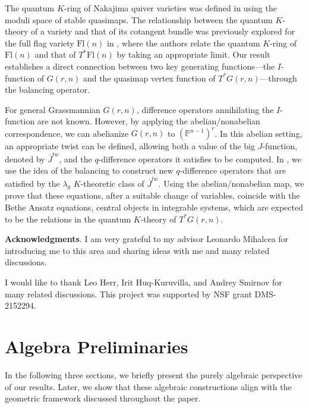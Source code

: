 \documentclass{amsart}
\begin{document}
The quantum $K$-ring of Nakajima quiver varieties was defined in \cite{PSZ} using the moduli space of stable quasimaps. The relationship between the quantum $K$-theory of a variety and that of its cotangent bundle was previously explored for the full flag variety $\mathrm{Fl}(n)$ in \cite{MR4308933}, where the authors relate the quantum $K$-ring of $\mathrm{Fl}(n)$ and that of $T^*\mathrm{Fl}(n)$ by taking an appropriate limit. Our result establishes a direct connection between two key generating functions—the $I$-function of $G(r,n)$ and the quasimap vertex function of $T^*G(r,n)$—through the balancing operator.
 
 For general Grassmannian $G(r,n)$, difference operators annihilating the $I$-function are not known. However, by applying the abelian/nonabelian correspondence, we can abelianize $G(r,n)$ to $(\mathbb{P}^{n-1})^r$. In this abelian setting, an appropriate twist can be defined, allowing both a value of the big $J$-function, denoted by $\overline{J}^{tw}$, and the $q$-difference operators it satisfies to be computed. In , we use the idea of the balancing to construct new $q$-difference operators that are satisfied by the $\lambda_y$ $K$-theoretic class of $\overline{J}^{tw}$. Using the abelian/nonabelian map, we prove that these equations, after a suitable change of variables, coincide with the Bethe Ansatz equations, central objects in integrable systems, which are expected to be the relations in the quantum $K$-theory of $T^*G(r,n)$. 

\textbf{Acknowledgments}. I am very grateful to my advisor Leonardo Mihalcea for introducing me to this area and sharing ideas with me and many related discussions. 

I would like to thank Leo Herr, Irit Huq-Kuruvilla, and Andrey Smirnov for many related discussions. This project was supported by NSF grant DMS-2152294.


\section{Algebra Preliminaries}
In the following three sections, we briefly present the purely algebraic perspective of our results. Later, we show that these algebraic constructions align with the geometric framework discussed throughout the paper.
\end{document}
